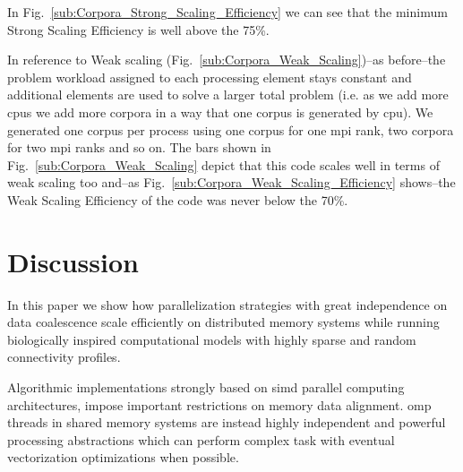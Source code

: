 \documentclass[10pt,journal,compsoc]{IEEEtran}
\begin{document}
In Fig.~\ref{sub:Corpora_Strong_Scaling_Efficiency} we can see that the minimum Strong Scaling Efficiency is well above the 75\%.

In reference to Weak scaling (Fig.~\ref{sub:Corpora_Weak_Scaling})--as before--the problem workload assigned to each processing element stays constant and additional elements are used to solve a larger total problem (i.e. as we add more \glspl{cpu} we add more corpora in a way that one corpus is generated by \gls{cpu}). We generated one corpus per process using one corpus for one \gls{mpi} rank, two corpora for two \gls{mpi} ranks and so on. The bars shown in Fig.~\ref{sub:Corpora_Weak_Scaling} depict that this code scales well in terms of weak scaling too and--as Fig.~\ref{sub:Corpora_Weak_Scaling_Efficiency} shows--the Weak Scaling Efficiency of the code was never below the 70\%.










\section{Discussion}

In this paper we show how parallelization strategies with great independence on data coalescence scale efficiently on distributed memory systems while running biologically inspired computational models with highly sparse and random connectivity profiles.

Algorithmic implementations strongly based on \gls{simd} parallel computing architectures, impose important restrictions on memory data alignment. \gls{omp} threads in shared memory systems are instead highly independent and powerful processing abstractions which can perform complex task with eventual vectorization optimizations when possible.
\end{document}
